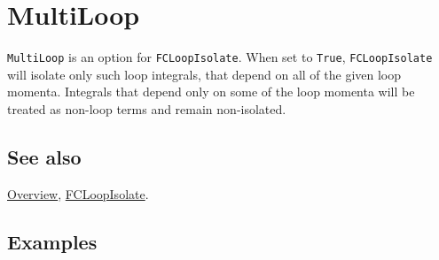 \documentclass[../FeynCalcManual.tex]{subfiles}
\begin{document}
\hypertarget{multiloop}{
\section{MultiLoop}\label{multiloop}}

\texttt{MultiLoop} is an option for \texttt{FCLoopIsolate}. When set to
\texttt{True}, \texttt{FCLoopIsolate} will isolate only such loop
integrals, that depend on all of the given loop momenta. Integrals that
depend only on some of the loop momenta will be treated as non-loop
terms and remain non-isolated.

\subsection{See also}

\hyperlink{toc}{Overview}, \hyperlink{fcloopisolate}{FCLoopIsolate}.

\subsection{Examples}
\end{document}
